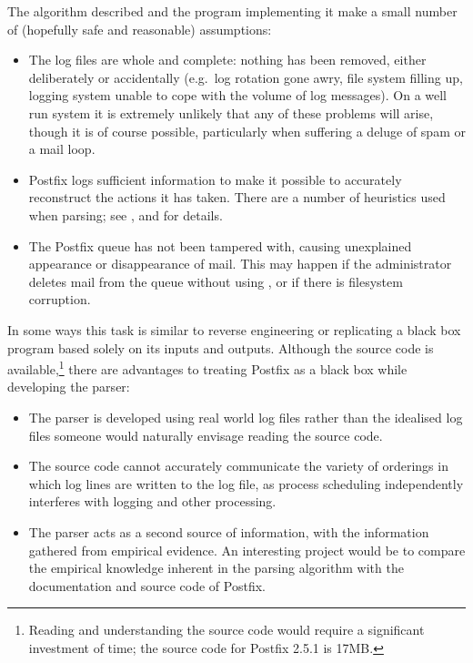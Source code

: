 The algorithm described and the program implementing it make a small number
of (hopefully safe and reasonable) assumptions:

\begin{itemize}

    \item The log files are whole and complete: nothing has been removed,
        either deliberately or accidentally (e.g.\ log rotation gone awry,
        file system filling up, logging system unable to cope with the
        volume of log messages).  On a well run system it is extremely
        unlikely that any of these problems will arise, though it is of
        course possible, particularly when suffering a deluge of spam or a
        mail loop.

    \item Postfix logs sufficient information to make it possible to
        accurately reconstruct the actions it has taken.  There are a
        number of heuristics used when parsing; see
        ,
         and  for details.

    \item The Postfix queue has not been tampered with, causing unexplained
        appearance or disappearance of mail.  This may happen if the
        administrator deletes mail from the queue without using 
        , or if there is filesystem corruption.

\end{itemize}

In some ways this task is similar to reverse engineering or replicating a
black box program based solely on its inputs and outputs.  Although the
source code is available,\footnote{Reading and understanding the source
code would require a significant investment of time; the source code for
Postfix 2.5.1 is 17MB.} there are advantages to treating Postfix as a black
box while developing the parser:

\begin{itemize}

    \item The parser is developed using real world log files rather than
        the idealised log files someone would naturally envisage reading
        the source code.

    \item The source code cannot accurately communicate the variety of
        orderings in which log lines are written to the log file, as
        process scheduling independently interferes with logging and other
        processing.

    \item The parser acts as a second source of information, with the
        information gathered from empirical evidence.  An interesting
        project would be to compare the empirical knowledge inherent in the
        parsing algorithm with the documentation and source code of
        Postfix.

\end{itemize}


